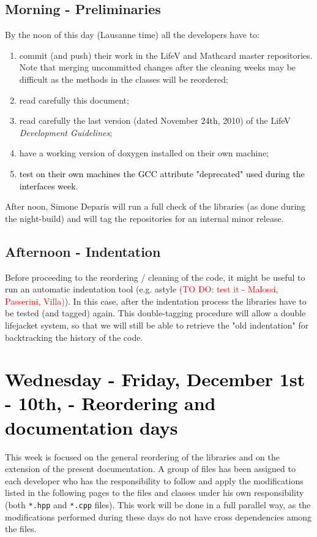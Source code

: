 \documentclass[10p]{article}
\newcommand{\todo}[1]{\textcolor{red}{#1}}
\newcommand{\newparts}[1]{\textcolor{black}{#1}}
\newcommand{\newpartsVC}[1]{\textcolor{black}{#1}}
\theoremstyle{definition}
\begin{document}
\subsection*{Morning - Preliminaries}
By the noon of this day (Lausanne time) all the developers have to:
\begin{enumerate}
  \item commit (and push) their work in the LifeV and Mathcard master repositories. Note that merging uncommitted changes after the cleaning weeks may be difficult as the methods in the classes will be reordered;
  \item read carefully this document;
  \item read carefully the last version (dated November \newpartsVC{24th}, 2010) of the LifeV \emph{Development Guidelines};
  \item have a working version of doxygen installed on their own machine;
  \item \newpartsVC{test on their own machines the GCC attribute "deprecated" used during the interfaces week}.
\end{enumerate}
After noon, Simone Deparis will run a full check of the libraries (as done during the night-build) and will tag the repositories for an internal minor release. 

\subsection*{Afternoon - Indentation}
Before proceeding to the reordering / cleaning of the code, it might be useful to run an automatic indentation tool (e.g. astyle \todo{(TO DO: test it - Malossi, Passerini, Villa)}). In this case, after the indentation process the libraries have to be tested (and tagged) again. This double-tagging procedure will allow a double lifejacket system, so that we will still be able to retrieve the "old indentation" for backtracking the history of the code.




\section*{\newparts{Wednesday - Friday, December 1st - 10th, - Reordering and documentation days}}
This week is focused on the general reordering of the libraries and on the extension of the present documentation. A group of files has been assigned to each developer who has the responsibility to follow and apply the modifications listed in the following pages to the files and classes under his own responsibility (both \texttt{*.hpp} and \texttt{*.cpp} files). This work will be done in a full parallel way, as the modifications performed during these days do not have cross dependencies among the files.
\end{document}
